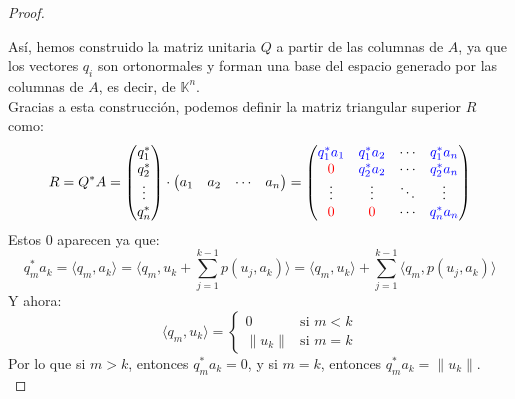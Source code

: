 \begin{proof}
\begin{center}
    \end{center}
    Así, hemos construido la matriz unitaria $ Q $ a partir de las columnas de $ A $, ya que los vectores $ q_i $ son ortonormales y forman una base del espacio generado por las columnas de $ A $, es decir, de $\mathbb{K}^n$.\\
    Gracias a esta construcción, podemos definir la matriz triangular superior $ R $ como:
    \[
        R = Q^* A =
        \begin{pmatrix}
            q_1^* \\
            q_2^* \\
            \vdots \\
            q_n^*
        \end{pmatrix}
        \cdot
        \begin{pmatrix}
            a_1 & a_2 & \cdots & a_n
        \end{pmatrix} =
        \begin{pmatrix}
            \color{blue} q_1^* a_1 & \color{blue}q_1^* a_2 & \cdots & \color{blue}q_1^* a_n \\
            \color{red} 0 & \color{blue} q_2^* a_2 & \cdots & \color{blue} q_2^* a_n \\
            \vdots & \vdots & \ddots & \vdots \\
            \color{red} 0 & \color{red} 0 & \cdots & \color{blue} q_n^* a_n
        \end{pmatrix}
    \]
    Estos $0$ aparecen ya que:
    \[
        q_m^* a_k =
        \langle q_m, a_k \rangle =
        \langle q_m, u_k + \sum_{j=1}^{k-1} p(u_j, a_k) \rangle =
        \langle q_m, u_k \rangle + \sum_{j=1}^{k-1} \langle q_m, p(u_j, a_k) \rangle
    \]
    Y ahora:
    \[
        \langle q_m, u_k \rangle =
        \begin{cases}
            0 & \text{si } m < k \\
            \|u_k\| & \text{si } m = k
        \end{cases}
    \]
    Por lo que si $ m > k $, entonces $ q_m^* a_k = 0 $, y si $ m = k $, entonces $ q_m^* a_k = \|u_k\| $.\\

\end{proof}
